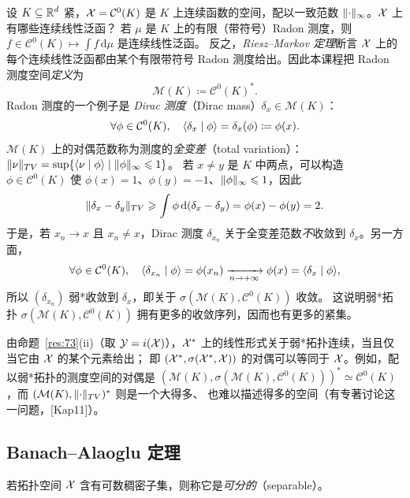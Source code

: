 \begin{example}[测度]
\label{exa:28}
设 $K\subseteq\mathbb{R}^d$ 紧，$\mathcal{X}=\mathcal{C}^0(K)$ 是 $K$ 上连续函数的空间，配以一致范数 $\lVert \cdot\rVert_\infty$。$\mathcal{X}$ 上有哪些连续线性泛函？
若 $\mu$ 是 $K$ 上的有限（带符号）Radon 测度，则 $f\in\mathcal{C}^0(K)\mapsto\int f\,\mathrm{d}\mu$ 是连续线性泛函。
反之，\emph{Riesz--Markov 定理}断言 $\mathcal{X}$ 上的每个连续线性泛函都由某个有限带符号 Radon 测度给出。因此本课程把 Radon 测度空间\emph{定义}为
\[
  \mathcal{M}(K)\coloneqq\mathcal{C}^0(K)^* .
\]
Radon 测度的一个例子是 \emph{Dirac 测度}（Dirac mass）$\delta_x\in\mathcal{M}(K)$：
\[
  \forall\phi\in\mathcal{C}^0(K),\quad\langle \delta_x \mid \phi\rangle=\delta_x(\phi)\coloneqq\phi(x).
\]
$\mathcal{M}(K)$ 上的对偶范数称为测度的\emph{全变差}（total variation）：$\lVert \nu\rVert_{TV}=\sup\{\langle \nu \mid \phi\rangle\mid\lVert \phi\rVert_\infty\leqslant1\}$。
若 $x\neq y$ 是 $K$ 中两点，可以构造 $\phi\in\mathcal{C}^0(K)$ 使 $\phi(x)=1$、$\phi(y)=-1$、$\lVert \phi\rVert_\infty\leqslant1$，因此
\[
  \lVert \delta_x-\delta_y\rVert_{TV}\geqslant\int\phi\,\mathrm{d}(\delta_x-\delta_y)=\phi(x)-\phi(y)=2 .
\]
于是，若 $x_n\to x$ 且 $x_n\neq x$，Dirac 测度 $\delta_{x_n}$ 关于全变差范数\emph{不}收敛到 $\delta_x$。另一方面，
\[
  \forall\phi\in\mathcal{C}^0(K),\quad\langle \delta_{x_n} \mid \phi\rangle=\phi(x_n)\xrightarrow[n\to+\infty]{}\phi(x)=\langle \delta_x \mid \phi\rangle,
\]
所以 $(\delta_{x_n})$ 弱*收敛到 $\delta_x$，即关于 $\sigma(\mathcal{M}(K),\mathcal{C}^0(K))$ 收敛。
这说明弱*拓扑 $\sigma(\mathcal{M}(K),\mathcal{C}^0(K))$ 拥有更多的收敛序列，因而也有更多的紧集。
\end{example}

\begin{remark}
\label{rem:31}
由命题~\ref{res:73}(ii)（取 $\mathcal{Y}=i(\mathcal{X})$），$\mathcal{X}^{*}$ 上的线性形式关于弱*拓扑连续，当且仅当它由 $\mathcal{X}$ 的某个元素给出；
即 $(\mathcal{X}^{*},\sigma(\mathcal{X}^{*},\mathcal{X}))$ 的对偶可以等同于 $\mathcal{X}$。例如，配以弱*拓扑的测度空间的对偶是
$(\mathcal{M}(K),\sigma(\mathcal{M}(K),\mathcal{C}^0(K)))^*\simeq\mathcal{C}^0(K)$，而 $(\mathcal{M}(K),\lVert \cdot\rVert_{TV})^*$ 则是一个大得多、
也难以描述得多的空间（有专著讨论这一问题，[Kap11]）。
\end{remark}

\subsection{Banach--Alaoglu 定理}

\begin{definition}[可分性]
\label{def:40}
若拓扑空间 $\mathcal{X}$ 含有可数稠密子集，则称它是\emph{可分的}（separable）。
\end{definition}

